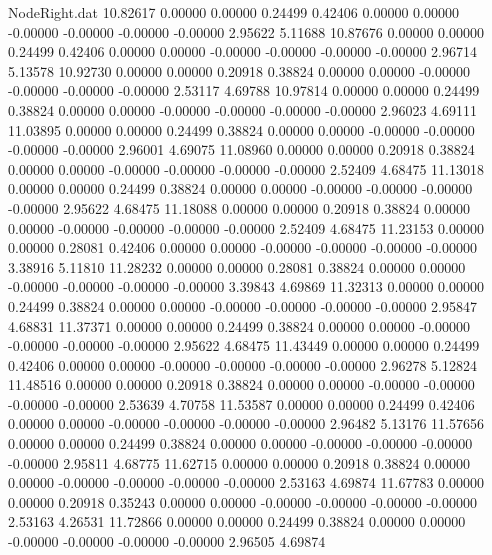 \begin{filecontents}{NodeRight.dat}
  10.82617    0.00000    0.00000     0.24499    0.42406    0.00000    0.00000   -0.00000   -0.00000   -0.00000   -0.00000    2.95622    5.11688
  10.87676    0.00000    0.00000     0.24499    0.42406    0.00000    0.00000   -0.00000   -0.00000   -0.00000   -0.00000    2.96714    5.13578
  10.92730    0.00000    0.00000     0.20918    0.38824    0.00000    0.00000   -0.00000   -0.00000   -0.00000   -0.00000    2.53117    4.69788
  10.97814    0.00000    0.00000     0.24499    0.38824    0.00000    0.00000   -0.00000   -0.00000   -0.00000   -0.00000    2.96023    4.69111
  11.03895    0.00000    0.00000     0.24499    0.38824    0.00000    0.00000   -0.00000   -0.00000   -0.00000   -0.00000    2.96001    4.69075
  11.08960    0.00000    0.00000     0.20918    0.38824    0.00000    0.00000   -0.00000   -0.00000   -0.00000   -0.00000    2.52409    4.68475
  11.13018    0.00000    0.00000     0.24499    0.38824    0.00000    0.00000   -0.00000   -0.00000   -0.00000   -0.00000    2.95622    4.68475
  11.18088    0.00000    0.00000     0.20918    0.38824    0.00000    0.00000   -0.00000   -0.00000   -0.00000   -0.00000    2.52409    4.68475
  11.23153    0.00000    0.00000     0.28081    0.42406    0.00000    0.00000   -0.00000   -0.00000   -0.00000   -0.00000    3.38916    5.11810
  11.28232    0.00000    0.00000     0.28081    0.38824    0.00000    0.00000   -0.00000   -0.00000   -0.00000   -0.00000    3.39843    4.69869
  11.32313    0.00000    0.00000     0.24499    0.38824    0.00000    0.00000   -0.00000   -0.00000   -0.00000   -0.00000    2.95847    4.68831
  11.37371    0.00000    0.00000     0.24499    0.38824    0.00000    0.00000   -0.00000   -0.00000   -0.00000   -0.00000    2.95622    4.68475
  11.43449    0.00000    0.00000     0.24499    0.42406    0.00000    0.00000   -0.00000   -0.00000   -0.00000   -0.00000    2.96278    5.12824
  11.48516    0.00000    0.00000     0.20918    0.38824    0.00000    0.00000   -0.00000   -0.00000   -0.00000   -0.00000    2.53639    4.70758
  11.53587    0.00000    0.00000     0.24499    0.42406    0.00000    0.00000   -0.00000   -0.00000   -0.00000   -0.00000    2.96482    5.13176
  11.57656    0.00000    0.00000     0.24499    0.38824    0.00000    0.00000   -0.00000   -0.00000   -0.00000   -0.00000    2.95811    4.68775
  11.62715    0.00000    0.00000     0.20918    0.38824    0.00000    0.00000   -0.00000   -0.00000   -0.00000   -0.00000    2.53163    4.69874
  11.67783    0.00000    0.00000     0.20918    0.35243    0.00000    0.00000   -0.00000   -0.00000   -0.00000   -0.00000    2.53163    4.26531
  11.72866    0.00000    0.00000     0.24499    0.38824    0.00000    0.00000   -0.00000   -0.00000   -0.00000   -0.00000    2.96505    4.69874

\end{filecontents}
